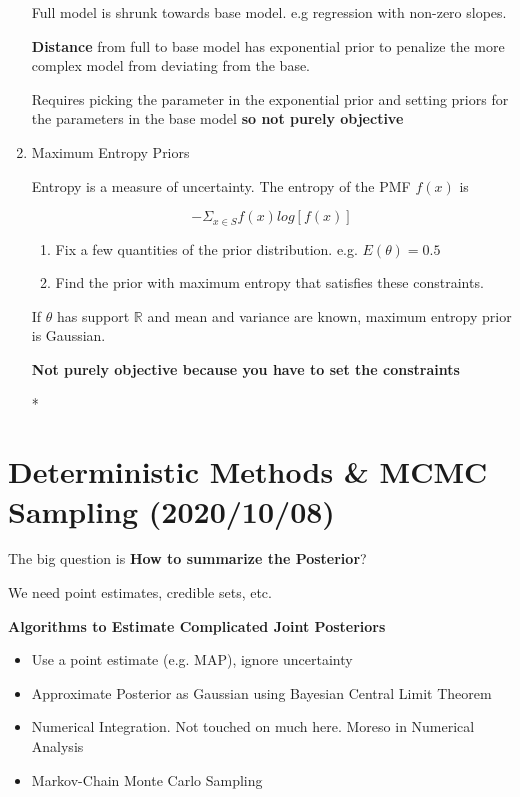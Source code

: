 \documentclass[11pt]{article}
\begin{document}
\begin{enumerate}
Full model is shrunk towards base model. e.g regression with non-zero slopes.

\textbf{Distance} from full to base model has exponential prior to penalize the more
 complex model from deviating from the base.

Requires picking the parameter in the exponential prior and setting priors for
the parameters in the base model \textbf{so not purely objective}

\item Maximum Entropy Priors
\label{sec:org89d81f8}

Entropy is a measure of uncertainty. The entropy of the PMF \(f(x)\) is

$$- \Sigma_{x \in S} f(x) log[f(x)]$$

\begin{enumerate}
\item Fix a few quantities of the prior distribution. e.g. \(E(\theta) = 0.5\)
\item Find the prior with maximum entropy that satisfies these constraints.
\end{enumerate}

If \(\theta\) has support \(\mathbb{R}\) and mean and variance are known, maximum
entropy prior is Gaussian.

\textbf{Not purely objective because you have to set the constraints}

*
\end{enumerate}

\section{Deterministic Methods \& MCMC Sampling (2020/10/08)}
\label{sec:orgaa4688d}

The big question is \textbf{How to summarize the Posterior}?

We need point estimates, credible sets, etc.

\textbf{Algorithms to Estimate Complicated Joint Posteriors}

\begin{itemize}
\item Use a point estimate (e.g. MAP), ignore uncertainty
\item Approximate Posterior as Gaussian using Bayesian Central Limit Theorem
\item Numerical Integration. Not touched on much here. Moreso in Numerical Analysis
\item Markov-Chain Monte Carlo Sampling
\end{itemize}
\end{document}
